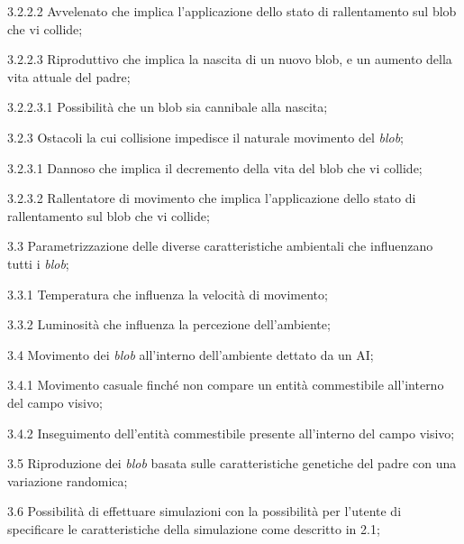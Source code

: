 \begin{myEnumerate}
\begin{myEnumerate}[label*=\arabic*.]
\begin{myEnumerate}[label*=\arabic*.]
\begin{myEnumerate}[label*=\arabic*.]
			\item[3.2.2.2] Avvelenato che implica l'applicazione dello stato di rallentamento sul blob che vi collide;
			\item[3.2.2.3] Riproduttivo che implica la nascita di un nuovo blob, e un aumento della vita attuale del padre;
			\begin{myEnumerate}[label*=\arabic*.]
        			\item[3.2.2.3.1] Possibilità che un blob sia cannibale alla nascita;
    			\end{myEnumerate}
    		\end{myEnumerate}
		\item[3.2.3] Ostacoli la cui collisione impedisce il naturale movimento del \textit{blob};
		\begin{myEnumerate}[label*=\arabic*.]
        		\item[3.2.3.1] Dannoso che implica il decremento della vita del blob che vi collide;
			\item[3.2.3.2] Rallentatore di movimento che implica l'applicazione dello stato di rallentamento sul blob che vi collide;
    		\end{myEnumerate}
    	\end{myEnumerate}
	\item[3.3] Parametrizzazione delle diverse caratteristiche ambientali che influenzano tutti i \textit{blob};
	\begin{myEnumerate}[label*=\arabic*.]
        	\item[3.3.1] Temperatura che influenza la velocità di movimento;
		\item[3.3.2] Luminosità che influenza la percezione dell'ambiente;
    	\end{myEnumerate}
	\item[3.4] Movimento dei \textit{blob} all'interno dell'ambiente dettato da un AI;
	\begin{myEnumerate}[label*=\arabic*.]
        	\item[3.4.1] Movimento casuale finché non compare un entità commestibile all'interno del campo visivo;
		\item[3.4.2] Inseguimento dell'entità commestibile presente all'interno del campo visivo;
    	\end{myEnumerate}
	\item[3.5] Riproduzione dei \textit{blob} basata sulle caratteristiche genetiche del padre con una variazione randomica;
	\item[3.6] Possibilità di effettuare simulazioni con la possibilità per l'utente di specificare le caratteristiche della simulazione come descritto in 2.1;

\end{myEnumerate}
\end{myEnumerate}
